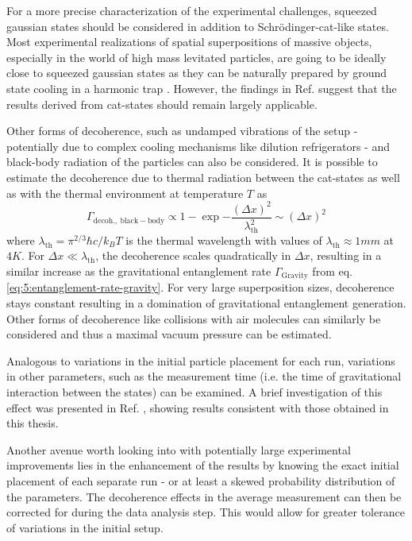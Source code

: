 For a more precise characterization of the experimental challenges, squeezed gaussian states \cite[p. 33-64]{Serafini_2017} should be considered in addition to Schrödinger-cat-like states.
Most experimental realizations of spatial superpositions of massive objects, especially in the world of high mass levitated particles, are going to be ideally close to squeezed gaussian states \cite[Timestamp: 23:00]{Aspelmeyer_2024} as they can be naturally prepared by ground state cooling in a harmonic trap \cite{Weiss_2021}.
However, the findings in Ref. \cite{Pedernales_2023} suggest that the results derived from cat-states should remain largely applicable.

Other forms of decoherence, such as undamped vibrations of the setup - potentially due to complex cooling mechanisms like dilution refrigerators - and black-body radiation of the particles can also be considered.
It is possible to estimate the decoherence due to thermal radiation \cite[p. 127-136]{Schlosshauer_2007} between the cat-states as well as with the thermal environment at temperature $T$ as \cite{RomeroIsart_2011}
\begin{equation}
  \Gamma_\mathrm{decoh.,\ black-body} \propto 1 - \exp{-\frac{(\Delta x)^2}{\lambda^2_\mathrm{th}}} \sim (\Delta x)^2
\end{equation}
where $\lambda_\mathrm{th} = \pi^{2/3} \hbar c / k_B T$ is the thermal wavelength with values of $\lambda_\mathrm{th} \approx 1\si{mm}$ at $4\si{K}$. 
For $\Delta x \ll \lambda_\mathrm{th}$, the decoherence scales quadratically in $\Delta x$, resulting in a similar increase as the gravitational entanglement rate $\Gamma_\mathrm{Gravity}$ from eq. \eqref{eq:5:entanglement-rate-gravity}.
For very large superposition sizes, decoherence stays constant resulting in a domination of gravitational entanglement generation.
Other forms of decoherence like collisions with air molecules can similarly be considered and thus a maximal vacuum pressure can be estimated.

Analogous to variations in the initial particle placement for each run, variations in other parameters, such as the measurement time (i.e. the time of gravitational interaction between the states) can be examined.
A brief investigation of this effect was presented in Ref. \cite{Nguyen_2020}, showing results consistent with those obtained in this thesis.

Another avenue worth looking into with potentially large experimental improvements lies in the enhancement of the results by knowing the exact initial placement of each separate run - or at least a skewed probability distribution of the parameters.
The decoherence effects in the average measurement can then be corrected for during the data analysis step.
This would allow for greater tolerance of variations in the initial setup.

